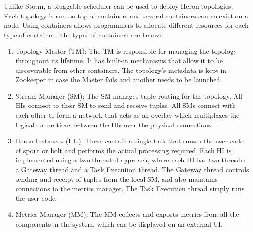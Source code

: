 Unlike Storm, a pluggable scheduler can be used to deploy Heron topologies. Each topology is run on top of containers and several containers can co-exist on a node. Using containers allows programmers to allocate different resources for each type of container.  The types of containers are below: 
\begin{enumerate}
	\item Topology Master (TM): The TM is responsible for managing the topology throughout its lifetime.  It has built-in mechanisms that allow it to be discoverable from other containers. The topology's metadata is kept in Zookeeper in case the Master fails and another needs to be launched.
	
	\item Stream Manager (SM): The SM manages tuple routing for the topology.  All HIs connect to their SM to send and receive tuples. All SMs connect with each other to form a network that acts as an overlay which multiplexes the logical connections between the HIs over the physical connections.  
		
	\item Heron Instances (HIs): These contain a single task that runs a the user code of  spout or bolt and performs the actual processing required. Each HI is implemented using a two-threaded approach, where each HI has two threads: a Gateway thread and a Task Execution thread. The Gateway thread controls sending and receipt of tuples from the local SM, and also maintains connections to the metrics manager. The Task Execution thread simply runs the user code. 

	\item Metrics Manager (MM): The MM collects and exports metrics from all the components in the system, which can be displayed on an external UI. 
 
\end{enumerate}





